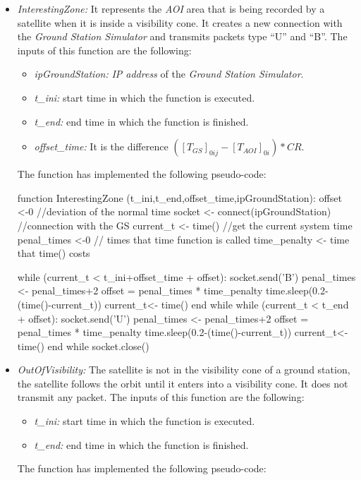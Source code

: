 \begin{itemize}
\item \emph{InterestingZone:} It represents the \emph{AOI} area that is being
  recorded by a satellite when it is inside a visibility cone. It creates a new
  connection with the \emph{Ground Station Simulator} and transmits packets type
  ``U'' and ``B''. The inputs of this function are the following:
\begin{itemize}
\item \emph{ipGroundStation:} \emph{IP address} of the \emph{Ground Station Simulator}.
\item \emph{t\_ini:} start time in which the function is executed.
\item \emph{t\_end:} end time in which the function is finished.
\item \emph{offset\_time:} It is the difference $([T_{GS}]_{0ij}- [T_{AOI}]_{0i} )*CR$.
\end{itemize}
The function has implemented the following pseudo-code:
\begin{listing}[
  float=h!,
  caption  = {Pseudocode of \emph{InterestingZone} function},
  label    = code:sss-interestingZone,
  style=customc]
function InterestingZone (t_ini,t_end,offset_time,ipGroundStation):
offset <-0 //deviation of the normal time 
socket <- connect(ipGroundStation) //connection with the GS
current_t <- time() //get the current system time
penal_times <-0 // times that time function is called
time_penalty <- time that time() costs

while (current_t <  t_ini+offset_time + offset):
	socket.send('B')
	penal_times <- penal_times+2
	offset = penal_times * time_penalty
	time.sleep(0.2-(time()-current_t))
current_t<- time()
end while
while (current_t <  t_end + offset):
	socket.send('U')
	penal_times <- penal_times+2
	offset = penal_times * time_penalty
	time.sleep(0.2-(time()-current_t))
current_t<- time()
end while
socket.close()
\end{listing}

\item \emph{OutOfVisibility:} The satellite is not in the visibility cone of a
  ground station, the satellite follows the orbit until it enters into a
  visibility cone. It does not transmit any packet. The inputs of this function
  are the following:
\begin{itemize}
\item \emph{t\_ini:} start time in which the function is executed.
\item \emph{t\_end:} end time in which the function is finished.
\end{itemize}
The function has implemented the following pseudo-code:


\end{itemize}
